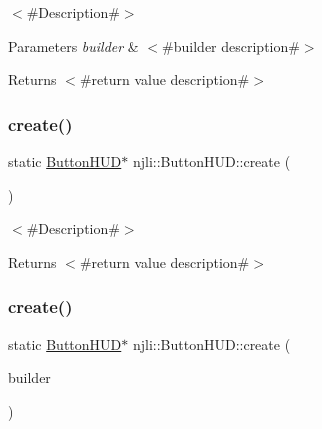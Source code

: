 $<$\#\+Description\#$>$


\begin{DoxyParams}{Parameters}
{\em builder} & $<$\#builder description\#$>$\\
\hline
\end{DoxyParams}
\begin{DoxyReturn}{Returns}
$<$\#return value description\#$>$ 
\end{DoxyReturn}
\mbox{\label{classnjli_1_1_button_h_u_d_ab24831855246bea2728f14c7c657d1a5}} 
\subsubsection{\texorpdfstring{create()}{create()}\hspace{0.1cm}{\footnotesize\ttfamily [2/3]}}
{\footnotesize\ttfamily static \mbox{\hyperlink{classnjli_1_1_button_h_u_d}{Button\+H\+UD}}$\ast$ njli\+::\+Button\+H\+U\+D\+::create (\begin{DoxyParamCaption}{ }\end{DoxyParamCaption})\hspace{0.3cm}{\ttfamily [static]}}

$<$\#\+Description\#$>$

\begin{DoxyReturn}{Returns}
$<$\#return value description\#$>$ 
\end{DoxyReturn}
\mbox{\label{classnjli_1_1_button_h_u_d_a3de59d29761170b76b44eff099b4b649}} 
\subsubsection{\texorpdfstring{create()}{create()}\hspace{0.1cm}{\footnotesize\ttfamily [3/3]}}
{\footnotesize\ttfamily static \mbox{\hyperlink{classnjli_1_1_button_h_u_d}{Button\+H\+UD}}$\ast$ njli\+::\+Button\+H\+U\+D\+::create (\begin{DoxyParamCaption}\item[{const \mbox{\hyperlink{classnjli_1_1_button_h_u_d_builder}{Button\+H\+U\+D\+Builder}} \&}]{builder }\end{DoxyParamCaption})\hspace{0.3cm}{\ttfamily [static]}}

